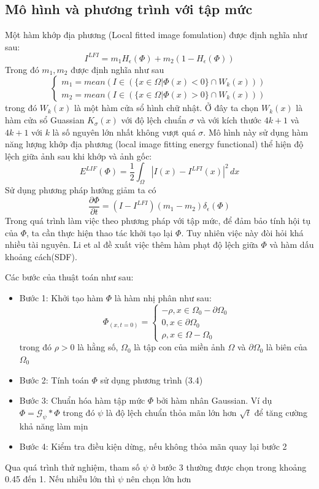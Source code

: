 \documentclass[12pt,oneside,a4]{report}
\newcommand{\G}{\mathcal G}
\begin{document}
\subsection{Mô hình và phương trình với tập mức}
Một hàm khớp địa phương (Local fitted image fomulation) được định nghĩa như sau:
\begin{equation}
I^{LFI}= m_1H_{\epsilon}(\Phi)+m_2(1-H_{\epsilon}(\Phi))
\end{equation}
Trong đó $m_1,m_2$ được định nghĩa như sau
\begin{equation}
\begin{cases}
 m_1=mean(I\in (\{x\in \Omega|\Phi(x)<0\}\cap W_k(x)))\\
  m_2=mean(I\in (\{x\in \Omega|\Phi(x)>0\}\cap W_k(x)))
   \end{cases}
\end{equation}
trong đó $W_k(x)$ là một hàm cửa sổ hình chữ nhật. Ở đây ta chọn $W_k(x)$  là hàm cửa sổ Guassian $K_{\sigma}(x)$ với độ lệch chuẩn $\sigma$ và với kích thước $4k+1$ và $4k+1$ với $k$ là số nguyên lớn nhất không vượt quá $\sigma$. Mô hình này sử dụng hàm năng lượng khớp địa phương (local image fitting energy functional) thể hiện độ lệch giữa ảnh sau khi khớp và ảnh gốc:
\begin{equation}
E^{LIF}(\Phi)=\dfrac{1}{2}\int_{\Omega}|I(x)-I^{LFI}(x)|^2\,dx
\end{equation}
Sử dụng phương pháp hướng giảm ta có
\begin{equation}
\dfrac{\partial \Phi}{\partial t}=(I-I^{LFI})(m_1-m_2)\delta_{\epsilon}(\Phi)
\end{equation}
Trong quá trình làm việc theo phương pháp với tập mức, để đảm bảo tính hội tụ của $\Phi$, ta cần thực hiện thao tác khởi tạo lại $\Phi$. Tuy nhiên việc này đòi hỏi khá nhiều tài nguyên. Li et al đề xuất việc thêm hàm phạt độ lệch giữa $\Phi$ và hàm dấu khoảng cách(SDF).

Các bước của thuật toán như sau:
\begin{itemize}
\item Bước 1: Khởi tạo hàm $\Phi$ là hàm nhị phân như sau:
\begin{equation}
\Phi_(x,t=0)=\begin{cases}
-\rho, x\in \Omega_0 -\partial \Omega_0\\
0, x\in \partial \Omega_0\\
\rho, x\in \Omega- \Omega_0
\end{cases}
\end{equation}
 trong đó $\rho>0$ là hằng số, $\Omega_0$ là tập con  của miền ảnh $\Omega$ và $\partial \Omega_0$ là biên của $\Omega_0$
 \item Bước 2: Tính toán $\Phi$ sử dụng phương trình (3.4)
 \item Bước 3: Chuẩn hóa hàm tập mức $\Phi$ bởi hàm nhân Gaussian. Ví dụ $\Phi=\G_{\psi}*\Phi$ trong đó $\psi$ là độ lệch chuẩn thỏa mãn lớn hơn $\sqrt{t}$ để tăng cường khả năng làm mịn
 \item Bước 4: Kiểm tra điều kiện dừng, nếu không thỏa mãn quay lại bước 2
\end{itemize}
Qua quá trình thử nghiệm, tham số $\psi$ ở bước 3 thường được chọn trong khoảng 0.45 đến 1. Nếu nhiễu lớn thì $\psi$ nên chọn lớn hơn
\end{document}
